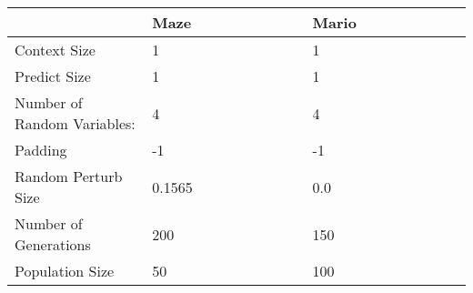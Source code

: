 \begin{tabular}{p{0.3\linewidth}|p{0.35\linewidth}|p{0.35\linewidth}}
\toprule
{} &                                                                                                                                         Maze &                                                                                                                     Mario \\
\midrule
Context Size                                 &                                                                                                                                            1 &                                                                                                                         1 \\
Predict Size                                 &                                                                                                                                            1 &                                                                                                                         1 \\
Number of Random Variables:                  &                                                                                                                                            4 &                                                                                                                         4 \\
Padding                                      &                                                                                                                                           -1 &                                                                                                                        -1 \\
Random Perturb Size                          &                                                                                                                                       0.1565 &                                                                                                                       0.0 \\
Number of Generations                        &                                                                                                                                          200 &                                                                                                                       150 \\
Population Size                              &                                                                                                                                           50 &                                                                                                                       100 \\

\end{tabular}
